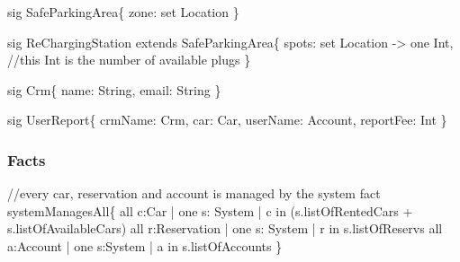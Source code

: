 \documentclass[a4paper]{article}
\begin{document}
sig SafeParkingArea\{ \newline
\hspace*{5 mm}	zone: set Location  \newline
\} \newline
 
sig ReChargingStation extends SafeParkingArea\{ \newline
\hspace*{5 mm}	spots: set Location -> one Int, //this Int is the number of available plugs \newline
\} \newline

sig Crm\{ \newline
\hspace*{5 mm}	name: String, \newline
\hspace*{5 mm}	email: String \newline
\} \newline

sig UserReport\{ \newline
\hspace*{5 mm}	crmName: Crm, \newline
\hspace*{5 mm}	car: Car, \newline
\hspace*{5 mm}	userName: Account, \newline
\hspace*{5 mm}	reportFee: Int \newline
\} \newline

\rmfamily
\subsubsection{Facts}
 
\ttfamily
//every car, reservation and account is managed by the system \newline
fact systemManagesAll\{ \newline
\hspace*{5 mm}	all c:Car | one s: System | c in (s.listOfRentedCars + s.listOfAvailableCars) \newline
\hspace*{5 mm}	all r:Reservation | one s: System | r in s.listOfReservs \newline
\hspace*{5 mm}	all a:Account | one s:System | a in s.listOfAccounts \newline
\} \newline
\end{document}
